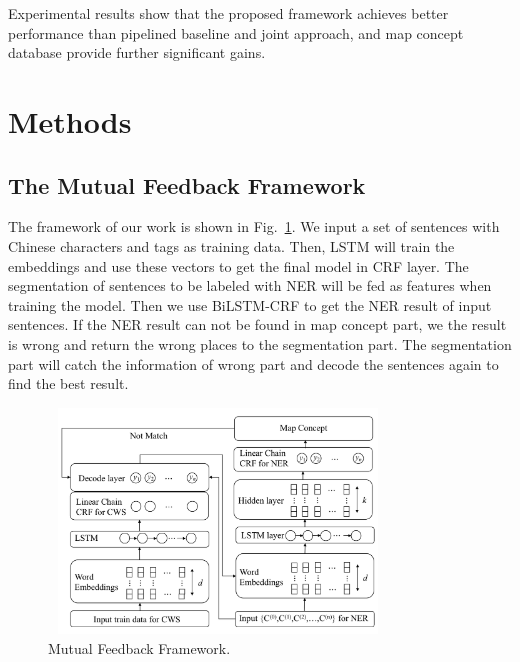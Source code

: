 \documentclass[conference]{IEEEtran}
\begin{document}
Experimental results show that the proposed framework achieves better performance than pipelined baseline and joint approach, and map concept database provide further significant gains.

\section{Methods}
\subsection{The Mutual Feedback Framework}
The framework of our work is shown in Fig.~\ref{fig:framework}. We input a set of sentences with Chinese characters and  tags as training data. Then, LSTM \cite{b15,b16} will train the embeddings and use these vectors to get the final model in CRF layer. The segmentation of sentences to be labeled with NER  will be fed as features when training the model. Then we use BiLSTM-CRF \cite{b17} to get the NER result of input sentences. If the NER result can not be found in map concept part, we the result is wrong and return the wrong places to the segmentation part. The segmentation part will catch the information of wrong part and decode the sentences again to find the best result. 
\begin{figure}[htbp]
\centerline{\includegraphics[height=6cm ,width=9cm]{framework.png}}
\caption{Mutual Feedback Framework.}
\label{fig:framework}
\end{figure}
\end{document}
